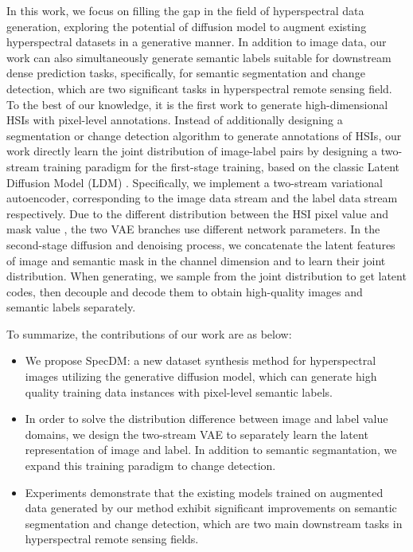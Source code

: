 In this work, we focus on filling the gap in the field of hyperspectral data generation, exploring the potential of diffusion model to augment existing hyperspectral datasets in a generative manner. In addition to image data, our work can also simultaneously generate semantic labels suitable for downstream dense prediction tasks, specifically, for semantic segmentation and change detection, which are two significant tasks in hyperspectral remote sensing field. To the best of our knowledge, it is the first work to generate high-dimensional HSIs with pixel-level annotations. Instead of additionally designing a segmentation or change detection algorithm to generate annotations of HSIs, our work directly learn the joint distribution of image-label pairs by designing a two-stream training paradigm for the first-stage training, based on the classic Latent Diffusion Model (LDM) \cite{ldm}. Specifically, we implement a two-stream variational autoencoder, corresponding to the image data stream and the label data stream respectively. Due to the different distribution between the HSI pixel value and mask value \cite{satsynth}, the two VAE branches use different network parameters. In the second-stage diffusion and denoising process, we concatenate the latent features of image and semantic mask in the channel dimension and to learn their joint distribution. When generating, we sample from the joint distribution to get latent codes, then decouple and decode them to obtain high-quality images and semantic labels separately.

To summarize, the contributions of our work are as below:

\begin{itemize}
    \item We propose SpecDM: a new dataset synthesis method for hyperspectral images utilizing the generative diffusion model, which can generate high quality training data instances with pixel-level semantic labels.

    \item In order to solve the distribution difference between image and label value domains, we design the two-stream VAE to separately learn the latent representation of image and label. In addition to semantic segmantation, we expand this training paradigm to change detection. 

    \item Experiments demonstrate that the existing models trained on augmented data generated by our method exhibit significant improvements on semantic segmentation and change detection, which are two main downstream tasks in hyperspectral remote sensing fields.
\end{itemize}